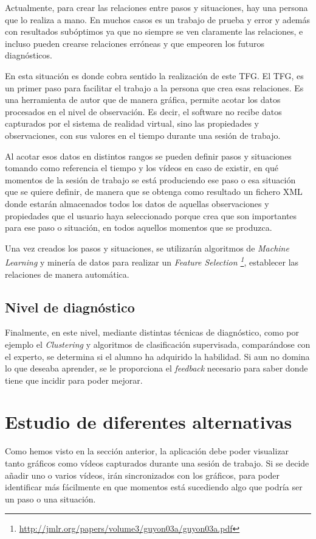 Actualmente, para crear las relaciones entre pasos y situaciones, hay una persona que lo realiza a mano. En muchos casos
es un trabajo de prueba y error y adem\'as con resultados sub\'optimos ya que no siempre se ven claramente las relaciones,
e incluso pueden crearse relaciones err\'oneas y que empeoren los futuros diagn\'osticos.

En esta situaci\'on es donde cobra sentido la realizaci\'on de este TFG. El TFG, es un primer paso para facilitar
el trabajo a la persona que crea esas relaciones. Es una herramienta de autor que de manera gr\'afica, permite
acotar los datos procesados en el nivel de observaci\'on. Es decir, el software no recibe datos capturados por
el sistema de realidad virtual, sino
las propiedades y observaciones, con sus valores en el tiempo durante una sesi\'on de trabajo.

Al acotar esos datos en distintos rangos se pueden definir pasos y situaciones tomando como referencia
el tiempo y los v\'ideos en caso de existir, en qu\'e momentos de la sesi\'on de trabajo
se est\'a produciendo ese paso o esa situaci\'on que se quiere definir, de manera que se obtenga
como resultado un fichero XML donde estar\'an almacenados todos los datos de aquellas observaciones y 
propiedades que el usuario haya seleccionado porque crea que son importantes para ese paso o situaci\'on,
en todos aquellos momentos que se produzca.

Una vez creados los pasos y situaciones, se utilizar\'an algoritmos de \emph{Machine Learning} y miner\'ia de datos para
realizar un \emph{Feature Selection \footnote{\url{http://jmlr.org/papers/volume3/guyon03a/guyon03a.pdf}}},
establecer las relaciones de manera autom\'atica.

\subsection{Nivel de diagn\'ostico}
Finalmente, en este nivel, mediante distintas t\'ecnicas de diagn\'ostico, como por ejemplo el \emph{Clustering} y
algoritmos de clasificaci\'on supervisada, compar\'andose con el experto,
se determina si el alumno ha adquirido la habilidad. Si aun no domina lo que deseaba aprender, se le proporciona el \emph{feedback} 
necesario para saber donde tiene que incidir para poder mejorar.

\section{Estudio de diferentes alternativas}
Como hemos visto en la secci\'on anterior, la aplicaci\'on debe poder visualizar tanto gr\'aficos como 
v\'ideos capturados durante una sesi\'on de trabajo. Si se decide a\~nadir uno o varios v\'ideos, ir\'an
sincronizados con los gr\'aficos, para poder identificar m\'as f\'acilmente en que momentos est\'a sucediendo
algo que podr\'ia ser un paso o una situaci\'on.


